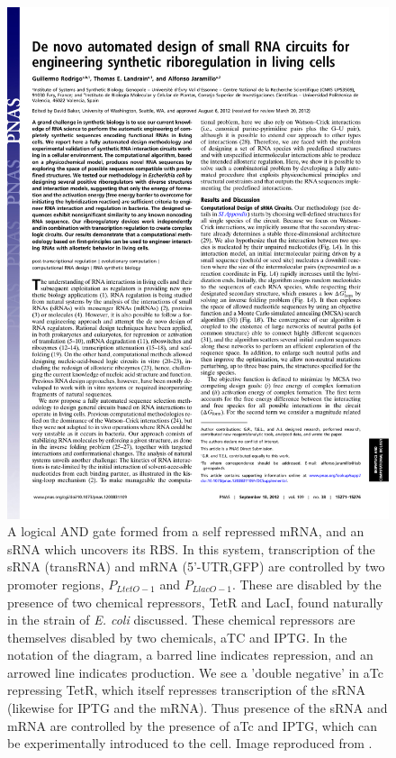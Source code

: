 \documentclass[10pt,journal]{./IEEE_latex_class/IEEEtran}
\begin{document}
\begin{figure}[t]
\centering
\includegraphics[trim = 30 600 30 0,page=4,clip = true]{pnas1203831109.pdf}
\caption{A logical AND gate formed from a self repressed mRNA, and an sRNA which uncovers its RBS. In this system, transcription of the sRNA (transRNA) and mRNA (5'-UTR,GFP) are controlled by two promoter regions, $P_{LtetO-1}$ and $P_{LlacO-1}$. These are disabled by the presence of two chemical repressors, TetR and LacI, found naturally in the strain of \textit{E. coli} discussed. These chemical repressors are themselves disabled by two chemicals, aTC and IPTG. In the notation of the diagram, a barred line indicates repression, and an arrowed line indicates production. We see a 'double negative' in aTc repressing TetR, which itself represses transcription of the sRNA (likewise for IPTG and the mRNA). Thus presence of the sRNA and mRNA are controlled by the presence of aTc and IPTG, which can be experimentally introduced to the cell.  Image reproduced from \cite{Rodrigo2012}.}
\label{ANDGate}
\end{figure}
\end{document}
